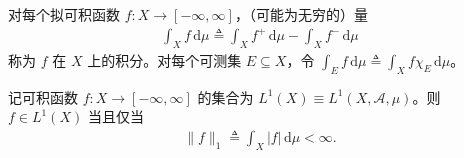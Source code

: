\documentclass[../../main.tex]{subfiles}%
\begin{document}
对每个拟可积函数 $f:X\to[-\infty,\infty]$，（可能为无穷的）量
\begin{align*}
\int_Xf\,\mathrm{d}\mu\triangleq\int_Xf^+\,\mathrm{d}\mu-\int_Xf^-\,\mathrm{d}\mu
\end{align*}
称为 $f$ 在 $X$ 上的积分。对每个可测集 $E\subseteq X$，令 $\int_Ef\,\mathrm{d}\mu\triangleq\int_Xf\chi_E\,\mathrm{d}\mu$。

记可积函数 $f:X\to[-\infty,\infty]$ 的集合为 $L^1(X)\equiv L^1(X,\mathscr A,\mu)$。则 $f\in L^1(X)$ 当且仅当
\begin{align*}
\|f\|_1\triangleq\int_X|f|\,\mathrm{d}\mu<\infty.
\end{align*}

\end{document}
